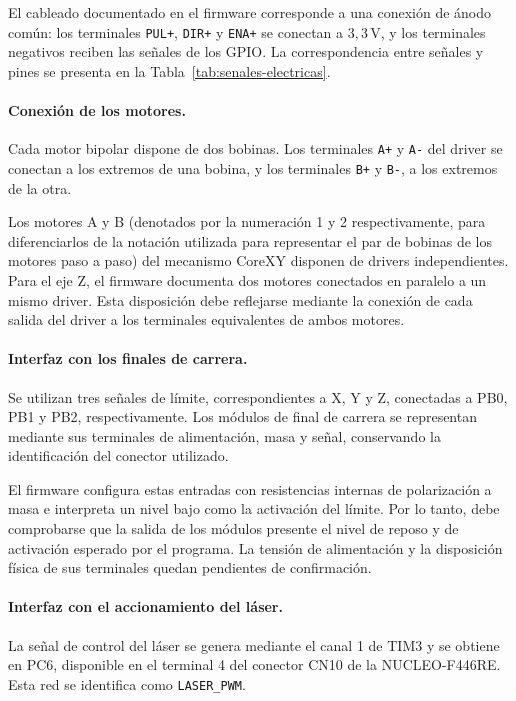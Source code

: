 \documentclass[blue,fullpaper]{ludusofficial}  %
\begin{document}
El cableado documentado en el firmware corresponde
a una conexión de ánodo común: los terminales
\texttt{PUL+}, \texttt{DIR+} y \texttt{ENA+}
se conectan a $3{,}3\,\mathrm{V}$, y los terminales
negativos reciben las señales de los GPIO.
La correspondencia entre señales y pines se presenta
en la Tabla~\ref{tab:senales-electricas}.

\paragraph{Conexión de los motores.}
Cada motor bipolar dispone de dos bobinas.
Los terminales \texttt{A+} y \texttt{A-} del driver
se conectan a los extremos de una bobina,
y los terminales \texttt{B+} y \texttt{B-},
a los extremos de la otra.

Los motores A y B (denotados por la numeración 1 y 2 respectivamente, para diferenciarlos de la notación utilizada para representar el par de bobinas de los motores paso a paso) del mecanismo CoreXY disponen
de drivers independientes. Para el eje Z,
el firmware documenta dos motores conectados
en paralelo a un mismo driver. Esta disposición
debe reflejarse mediante la conexión de cada salida
del driver a los terminales equivalentes de ambos
motores.

\paragraph{Interfaz con los finales de carrera.}
Se utilizan tres señales de límite, correspondientes
a X, Y y Z, conectadas a PB0, PB1 y PB2,
respectivamente. Los módulos de final de carrera
se representan mediante sus terminales de alimentación,
masa y señal, conservando la identificación
del conector utilizado.

El firmware configura estas entradas con resistencias
internas de polarización a masa e interpreta
un nivel bajo como la activación del límite.
Por lo tanto, debe comprobarse que la salida
de los módulos presente el nivel de reposo
y de activación esperado por el programa.
La tensión de alimentación y la disposición física
de sus terminales quedan pendientes de confirmación.

\newpage

\paragraph{Interfaz con el accionamiento del láser.}
La señal de control del láser se genera mediante
el canal 1 de TIM3 y se obtiene en PC6,
disponible en el terminal 4 del conector CN10
de la NUCLEO-F446RE. Esta red se identifica
como \texttt{LASER\_PWM}.
\end{document}
